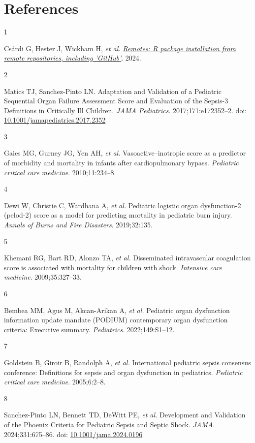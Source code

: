 \documentclass[
  letterpaper,
  DIV=11,
  numbers=noendperiod]{scrartcl}
\newlength{\cslhangindent}
\newlength{\csllabelwidth}
\newenvironment{CSLReferences}[2] %
 {\begin{list}{}{%
  \setlength{\itemindent}{0pt}
  \setlength{\leftmargin}{0pt}
  \setlength{\parsep}{0pt}
  \ifodd #1
   \setlength{\leftmargin}{\cslhangindent}
   \setlength{\itemindent}{-1\cslhangindent}
  \fi
  \setlength{\itemsep}{#2\baselineskip}}}
 {\end{list}}
\newcommand{\CSLLeftMargin}[1]{\parbox[t]{\csllabelwidth}{\strut#1\strut}}
\newcommand{\CSLRightInline}[1]{\parbox[t]{\linewidth - \csllabelwidth}{\strut#1\strut}}
\begin{document}
\section*{References}\label{references}

\label{refs}
\begin{CSLReferences}{0}{1}
\CSLLeftMargin{1 }%
\CSLRightInline{Csárdi G, Hester J, Wickham H, \emph{et al.}
\emph{\href{https://CRAN.R-project.org/package=remotes}{Remotes: R
package installation from remote repositories, including 'GitHub'}}.
2024.}

\CSLLeftMargin{2 }%
\CSLRightInline{Matics TJ, Sanchez-Pinto LN. {Adaptation and Validation
of a Pediatric Sequential Organ Failure Assessment Score and Evaluation
of the Sepsis-3 Definitions in Critically Ill Children}. \emph{JAMA
Pediatrics}. 2017;171:e172352--2. doi:
\href{https://doi.org/10.1001/jamapediatrics.2017.2352}{10.1001/jamapediatrics.2017.2352}}

\CSLLeftMargin{3 }%
\CSLRightInline{Gaies MG, Gurney JG, Yen AH, \emph{et al.}
Vasoactive--inotropic score as a predictor of morbidity and mortality in
infants after cardiopulmonary bypass. \emph{Pediatric critical care
medicine}. 2010;11:234--8.}

\CSLLeftMargin{4 }%
\CSLRightInline{Dewi W, Christie C, Wardhana A, \emph{et al.} Pediatric
logistic organ dysfunction-2 (pelod-2) score as a model for predicting
mortality in pediatric burn injury. \emph{Annals of Burns and Fire
Disasters}. 2019;32:135.}

\CSLLeftMargin{5 }%
\CSLRightInline{Khemani RG, Bart RD, Alonzo TA, \emph{et al.}
Disseminated intravascular coagulation score is associated with
mortality for children with shock. \emph{Intensive care medicine}.
2009;35:327--33.}

\CSLLeftMargin{6 }%
\CSLRightInline{Bembea MM, Agus M, Akcan-Arikan A, \emph{et al.}
Pediatric organ dysfunction information update mandate (PODIUM)
contemporary organ dysfunction criteria: Executive summary.
\emph{Pediatrics}. 2022;149:S1--12.}

\CSLLeftMargin{7 }%
\CSLRightInline{Goldstein B, Giroir B, Randolph A, \emph{et al.}
International pediatric sepsis consensus conference: Definitions for
sepsis and organ dysfunction in pediatrics. \emph{Pediatric critical
care medicine}. 2005;6:2--8.}

\CSLLeftMargin{8 }%
\CSLRightInline{Sanchez-Pinto LN, Bennett TD, DeWitt PE, \emph{et al.}
{Development and Validation of the Phoenix Criteria for Pediatric Sepsis
and Septic Shock}. \emph{JAMA}. 2024;331:675--86. doi:
\href{https://doi.org/10.1001/jama.2024.0196}{10.1001/jama.2024.0196}}

\end{CSLReferences}
\end{document}
